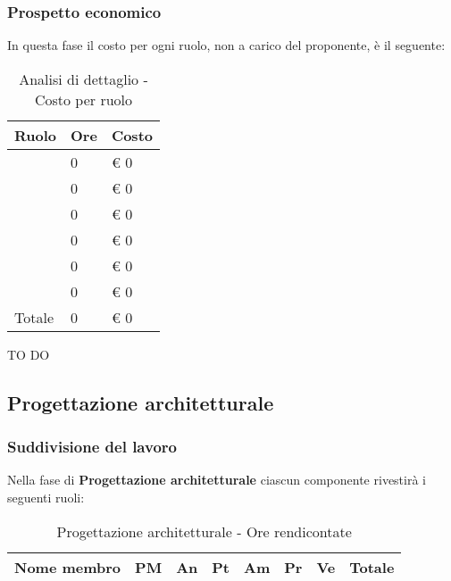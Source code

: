		\subsubsection{Prospetto economico} %
		\label{ssub:prospetto_economico}
		In questa fase il costo per ogni ruolo, non a carico del proponente, è il seguente: \\
			\begin{table}[!h]
				\begin{center}
					\begin{tabularx}{0.6\textwidth}{|l|l|X|}
						\hline
						\textbf{Ruolo} & \textbf{Ore} & \textbf{Costo} \\
						\hline
						\roleProjectManager & 0 & \euro{} 0 \\
						\hline
						\roleAnalyst & 0 & \euro{} 0 \\
						\hline
						\roleDesigner & 0 & \euro{} 0 \\
						\hline
						\roleAdministrator & 0 & \euro{} 0 \\
						\hline
						\roleProgrammer & 0 & \euro{} 0 \\
						\hline
						\roleVerifier & 0 & \euro{} 0 \\
						\hline
						Totale & 0 & \euro{} 0 \\
						\hline
					\end{tabularx}
				\end{center}
			\caption{Analisi di dettaglio - Costo per ruolo}
			\end{table}

		\noindent
		TO DO
		
	
	\subsection{Progettazione architetturale} %
	\label{sub:progettazione_architetturale}
		\subsubsection{Suddivisione del lavoro} %
		\label{ssub:suddivisione_del_lavoro}
		Nella fase di \textbf{Progettazione architetturale} ciascun componente rivestirà i seguenti ruoli: \\
			\begin{table}[!h]
				\begin{center}
					\begin{tabularx}{0.9\textwidth}{|l|l|l|l|l|l|l|X|}
						\hline
						\textbf{Nome membro} & \textbf{PM} & \textbf{An} & \textbf{Pt} & \textbf{Am} & \textbf{Pr} & \textbf{Ve} & \textbf{Totale} \\
						\hline
					
						\hline		
					\end{tabularx}
				\end{center}
			\caption{Progettazione architetturale - Ore rendicontate}
			\end{table}

